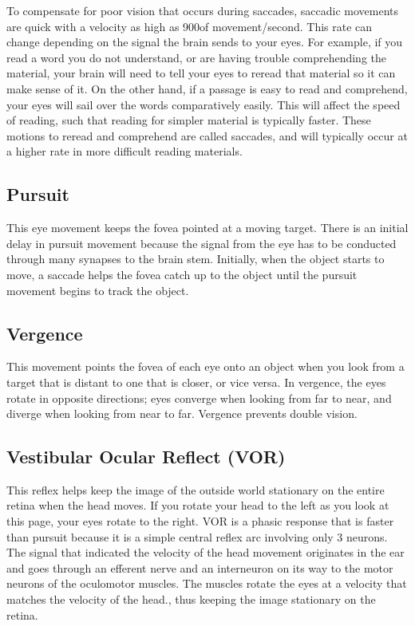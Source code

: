 \documentclass{article}
\begin{document}
To compensate for poor vision that occurs during saccades, saccadic movements are quick with a velocity as high as 900\degree of movement/second. This rate can change depending on the signal the brain sends to your eyes. For example, if you read a word you do not understand, or are having trouble comprehending the material, your brain will need to tell your eyes to reread that material so it can make sense of it. On the other hand, if a passage is easy to read and comprehend, your eyes will sail over the words comparatively easily. This will affect the speed of reading, such that reading for simpler material is typically faster. These motions to reread and comprehend are called saccades, and will typically occur at a higher rate in more difficult reading materials.

\subsection*{Pursuit}
This eye movement keeps the fovea pointed at a moving target. There is an initial delay in pursuit movement because the signal from the eye has to be conducted through many synapses to the brain stem. Initially, when the object starts to move, a saccade helps the fovea catch up to the object until the pursuit movement begins to track the object.

\subsection*{Vergence}
This movement points the fovea of each eye onto an object when you look from a target that is distant to one that is closer, or vice versa. In vergence, the eyes rotate in opposite directions; eyes converge when looking from far to near, and diverge when looking from near to far. Vergence prevents double vision.

\subsection*{Vestibular Ocular Reflect (VOR)}
This reflex helps keep the image of the outside world stationary on the entire retina when the head moves. If you rotate your head to the left as you look at this page, your eyes rotate to the right. VOR is a phasic response that is faster than pursuit because it is a simple central reflex arc involving only 3 neurons. The signal that indicated the velocity of the head movement originates in the ear and goes through an efferent nerve and an interneuron on its way to the motor neurons of the oculomotor muscles. The muscles rotate the eyes at a velocity that matches the velocity of the head., thus keeping the image stationary on the retina.
\end{document}

